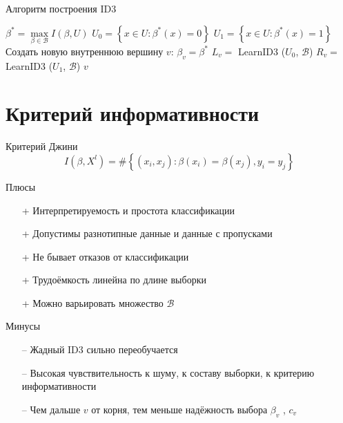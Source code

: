 \documentclass[10pt]{beamer}
\begin{document}
{
\begin{frame}{Алгоритм построения ID3}
  \begin{algorithmic}[1]
         \State {}
       \EndIf
       \State $\beta^* = \max\limits_{\beta \in \mathscr{B}} I(\beta, U)$
       \State $U_0 = \left\{ x \in U : \beta^*(x) = 0\right\}$	
       \State $U_1 = \left\{ x \in U : \beta^*(x) = 1\right\}$	
         \State {}
       \EndIf
       \State Создать новую внутреннюю вершину $v$: $\beta_v = \beta^*$
       \State $L_v =$ LearnID3 ($U_0$, $\mathscr{B}$)
       \State $R_v =$ LearnID3 ($U_1$, $\mathscr{B}$)
       \State \Return $v$
    \EndFunction
  \end{algorithmic}    
\end{frame}
}

\section{Критерий информативности}

\begin{frame}{Критерий Джини}
  $$I(\beta,X^l)= \# \left\{ (x_i, x_j): \beta(x_i) = \beta(x_j), y_i = y_j \right\}$$
\end{frame}

\begin{frame}{Плюсы}
	\begin{enumerate}[<+- |alert@+>] 
	\item[+] Интерпретируемость и простота классификации
	\item[+] Допустимы разнотипные данные и данные с пропусками
	\item[+] Не бывает отказов от классификации
	\item[+] Трудоёмкость линейна по длине выборки
	\item[+] Можно варьировать множество $\mathscr{B}$
	\end{enumerate}
\end{frame}

\begin{frame}{Минусы}
	\begin{enumerate} [<+- |alert@+>] 
	\item[--] Жадный ID3 сильно переобучается
	\item[--] Высокая чувствительность к шуму, к составу выборки, к критерию информативности
	\item[--] Чем дальше $v$ от корня, тем меньше надёжность выбора $\beta_v$ , $c_v$
	\end{enumerate}
\end{frame}
\end{document}
